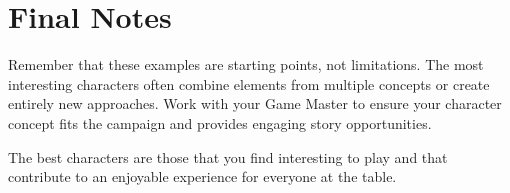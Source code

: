 \section{Final Notes}

Remember that these examples are starting points, not limitations. The most interesting characters often combine elements from multiple concepts or create entirely new approaches. Work with your Game Master to ensure your character concept fits the campaign and provides engaging story opportunities.

The best characters are those that you find interesting to play and that contribute to an enjoyable experience for everyone at the table.